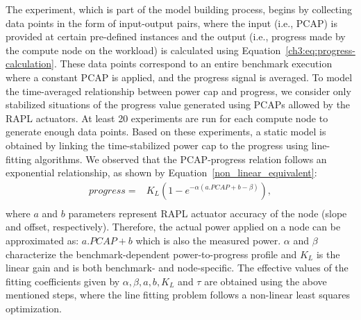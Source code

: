 The experiment, which is part of the model building process, begins by collecting data points in the form of input-output pairs, where the input (i.e., PCAP) is provided at certain pre-defined instances and the output (i.e., progress made by the compute node on the workload) is calculated using Equation~\eqref{ch3:eq:progress-calculation}. 
These data points correspond to an entire benchmark execution where a constant PCAP is applied, and the progress signal is averaged. To model the time-averaged relationship between power cap and progress, we consider only stabilized situations of the progress value generated using PCAPs allowed by the RAPL actuators. At least 20 experiments are run for each compute node to generate enough data points. Based on these experiments, a static model is obtained by linking the time-stabilized power cap to the progress using line-fitting algorithms. We observed that the PCAP-progress relation follows an exponential relationship, as shown by Equation~\eqref{non_linear_equivalent}:
\begin{equation}
    \begin{aligned}
          progress = & K_{L}(1-e^{-\alpha(a.PCAP+b-\beta)}),\\
    \end{aligned}
    \label{non_linear_equivalent}
\end{equation}
where $a$ and $b$ parameters represent RAPL actuator accuracy of the node (slope and offset, respectively). Therefore, the actual power applied on a node can be approximated as: $a.PCAP + b$ which is also the measured power. $\alpha$ and $\beta$ characterize the benchmark-dependent power-to-progress profile and $K_L$ is the linear gain and is both benchmark- and node-specific. The effective values of the fitting coefficients given by $\alpha, \beta, a, b, K_L$ and $ \tau $ are obtained using the above mentioned steps, where the line fitting problem follows a non-linear least squares optimization.
